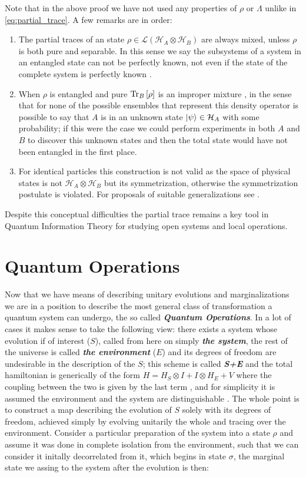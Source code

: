 Note that in the above proof we have not used any properties of $\rho$ or $\Lambda$ unlike in \eqref{eq:partial_trace}. A few remarks are
in order:
\begin{enumerate}
  \item The partial traces of an state $\rho \in \mathcal{L}(\mathcal{H}_{A}\otimes\mathcal{H}_{B})$ are always mixed, unless $\rho$ is
        both pure and separable. In this sense we say the subsystems of a system in an entangled state can not be perfectly known, not even if
        the state of the complete system is perfectly known \autocite{nielsen_quantum_2010, adesso2016introduction, diosi_short_2011}.
  \item When $\rho$ is entangled and pure $\mathrm{Tr}_{B}\left[\rho\right]$ is an improper mixture \cite{schlosshauer_decoherence_2007}, in the sense that for none of the possible ensembles that
        represent this density operator is possible to say that $A$ is in an unknown state $\ket{\psi} \in \mathcal{H}_{A}$  with some
        probability; if this were the case we could perform experiments in both $A$ and $B$ to discover this unknown states and then the total
        state would have not been entangled in the first place.
  \item For identical particles this construction is not valid as the space of physical states is not $\mathcal{H}_{A}\otimes \mathcal{H}_{B}$
        but its symmetrization, otherwise the symmetrization postulate is violated.
        For proposals of suitable generalizations see \cite{reyes-lega_aspects_2015}.
\end{enumerate}
Despite this conceptual difficulties the partial trace remains a key tool in Quantum Information Theory for studying open systems and
local operations.
\section{Quantum Operations}
Now that we have means of describing unitary evolutions and marginalizations we are in a position to describe the most general class
of transformation a quantum system can undergo, the so called \textbf{\textit{Quantum Operations}}. In a lot of cases it makes
sense to take the following view: there exists a system whose evolution if of interest  ($S$), called from here on simply \textbf{\textit{the
    system}}, the rest of the universe is called \textbf{\textit{the environment}} ($E$) and its degrees of freedom are undesirable
in the description of the $S$; this scheme is called \textit{\textbf{S+E}} and the total hamiltonian is generically of the form
$H = H_{S}\otimes I + I\otimes H_{E} + V$ where the coupling between the two is given by the last term \cite{wiseman_quantum_2010}, and
for simplicity it is assumed the environment and the system are distinguishable \cite{breuer2002theory}. The whole point
is to construct a map describing the evolution of $S$ solely with its degrees of freedom, achieved simply by evolving unitarily the
whole and tracing over the environment. Consider a particular preparation of the system into a state $\rho$ and assume it was done in complete
isolation from the environment, such that we can consider it initally decorrelated from it, which begins in state $\sigma$, the marginal state we assing to the system after the evolution is then:

